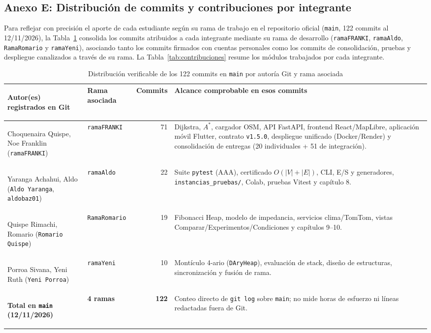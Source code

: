 \subsection*{Anexo E: Distribución de commits y contribuciones por integrante}
\label{anexo:contribuciones}
Para reflejar con precisión el aporte de cada estudiante según su rama de trabajo en el repositorio oficial (\texttt{main}, 122 commits al 12/11/2026), la Tabla~\ref{tab:distribucion_commits} consolida los commits atribuidos a cada integrante mediante su rama de desarrollo (\texttt{ramaFRANKI}, \texttt{ramaAldo}, \texttt{RamaRomario} y \texttt{ramaYeni}), asociando tanto los commits firmados con cuentas personales como los commits de consolidación, pruebas y despliegue canalizados a través de su rama. La Tabla~\ref{tab:contribuciones} resume los módulos trabajados por cada integrante.

\begin{table}[H]
    \centering
    \fontsize{8.8}{10.8}\selectfont
    \renewcommand{\arraystretch}{1.14}
    \caption{Distribución verificable de los 122 commits en \texttt{main} por autoría Git y rama asociada}
    \label{tab:distribucion_commits}
    \begin{tabularx}{\textwidth}{@{}>{\bfseries\raggedright\arraybackslash}p{4.3cm} >{\raggedright\arraybackslash}p{2.3cm} r >{\raggedright\arraybackslash}X@{}}
        \toprule
        \textbf{Autor(es) registrados en Git} & \textbf{Rama asociada} & \textbf{Commits} & \textbf{Alcance comprobable en esos commits} \\
        \midrule
        Choquenaira Quispe, Noe Franklin (\texttt{ramaFRANKI}) & \texttt{ramaFRANKI} & 71 & Dijkstra, $A^*$, cargador OSM, API FastAPI, frontend React/MapLibre, aplicación móvil Flutter, contrato \texttt{v1.5.0}, despliegue unificado (Docker/Render) y consolidación de entregas (20 individuales + 51 de integración). \\
        Yaranga Achahui, Aldo (\texttt{Aldo Yaranga}, \texttt{aldobaz01}) & \texttt{ramaAldo} & 22 & Suite \texttt{pytest} (AAA), certificado $O(|V|+|E|)$, CLI, E/S y generadores, \texttt{instancias\_pruebas/}, Colab, pruebas Vitest y capítulo 8. \\
        Quispe Rimachi, Romario (\texttt{Romario Quispe}) & \texttt{RamaRomario} & 19 & Fibonacci Heap, modelo de impedancia, servicios clima/TomTom, vistas Comparar/Experimentos/Condiciones y capítulos 9--10. \\
        Porroa Sivana, Yeni Ruth (\texttt{Yeni Porroa}) & \texttt{ramaYeni} & 10 & Montículo 4-ario (\texttt{DAryHeap}), evaluación de stack, diseño de estructuras, sincronización y fusión de rama. \\
        \midrule
        \textbf{Total en \texttt{main} (12/11/2026)} & \textbf{4 ramas} & \textbf{122} & Conteo directo de \texttt{git log} sobre \texttt{main}; no mide horas de esfuerzo ni líneas redactadas fuera de Git. \\
        \bottomrule
    \end{tabularx}
\end{table}

